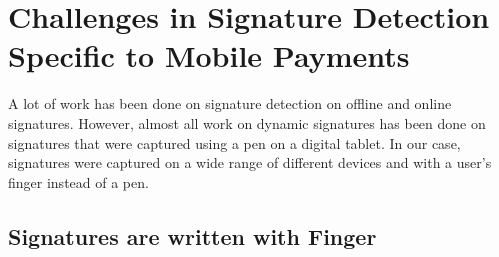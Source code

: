\documentclass[a4paper, oneside]{csthesis}
\begin{document}










\section{Challenges in Signature Detection Specific to Mobile Payments}

A lot of work has been done on signature detection on offline and online signatures. However, almost all work on dynamic signatures has been done on signatures that were captured using a pen on a digital tablet. In our case, signatures were captured on a wide range of different devices and with a user's finger instead of a pen.


\subsection{Signatures are written with Finger}
\end{document}
